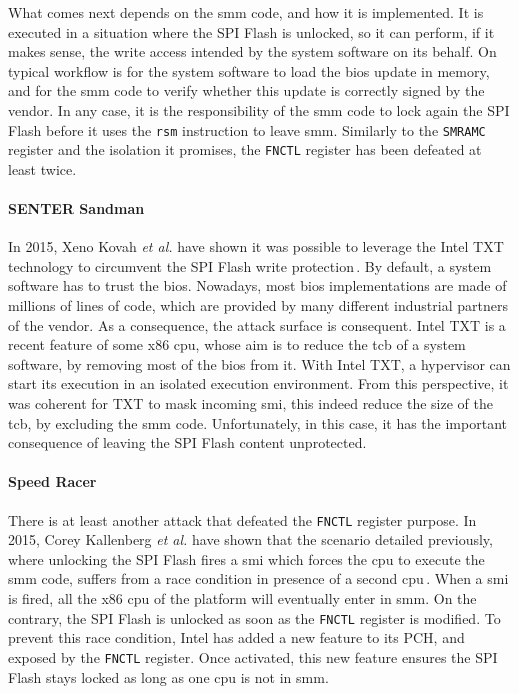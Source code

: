 What comes next depends on the \ac{smm} code, and how it is implemented.
%
It is executed in a situation where the SPI Flash is unlocked, so it can
perform, if it makes sense, the write access intended by the system software on
its behalf.
%
On typical workflow is for the system software to load the \ac{bios} update in
memory, and for the \ac{smm} code to verify whether this update is correctly
signed by the vendor.
%
In any case, it is the responsibility of the \ac{smm} code to lock again the SPI
Flash before it uses the \texttt{rsm} instruction to leave \ac{smm}.
%
Similarly to the \texttt{SMRAMC} register and the isolation it promises, the
\texttt{FNCTL} register has been defeated at least twice.

\paragraph{SENTER Sandman}
%
In 2015, Xeno Kovah \emph{et al.} have shown it was possible to leverage the
Intel TXT technology to circumvent the SPI Flash write
protection\,\cite{kovah2015senter}.
%
By default, a system software has to trust the \ac{bios}.
%
Nowadays, most \ac{bios} implementations are made of millions of lines of code,
which are provided by many different industrial partners of the vendor.
%
As a consequence, the attack surface is consequent.
%
Intel TXT is a recent feature of some x86 \ac{cpu}, whose aim is to reduce the
\ac{tcb} of a system software, by removing most of the \ac{bios} from it.
%
With Intel TXT, a hypervisor can start its execution in an isolated execution
environment.
%
From this perspective, it was coherent for TXT to mask incoming \ac{smi}, this
indeed reduce the size of the \ac{tcb}, by excluding the \ac{smm} code.
%
Unfortunately, in this case, it has the important consequence of leaving the SPI
Flash content unprotected.

\paragraph{Speed Racer}
%
There is at least another attack that defeated the \texttt{FNCTL} register
purpose.
%
In 2015, Corey Kallenberg \emph{et al.} have shown that the scenario detailed
previously, where unlocking the SPI Flash fires a \ac{smi} which forces the
\ac{cpu} to execute the \ac{smm} code, suffers from a race condition in presence
of a second \ac{cpu}\,\cite{kallenberg2015racecondition}.
%
When a \ac{smi} is fired, all the x86 \ac{cpu} of the platform will eventually
enter in \ac{smm}.
%
On the contrary, the SPI Flash is unlocked as soon as the \texttt{FNCTL}
register is modified.
%
To prevent this race condition, Intel has added a new feature to its PCH, and
exposed by the \texttt{FNCTL} register.
%
Once activated, this new feature ensures the SPI Flash stays locked as long as
one \ac{cpu} is not in \ac{smm}.

